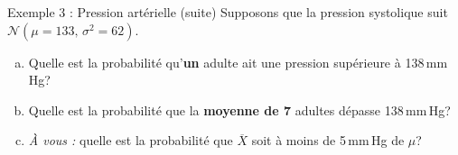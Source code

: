 \documentclass{BeamerTemplate}
\begin{document}
\begin{frame}[t]{Exemple 3 : Pression artérielle (suite)}
  Supposons que la pression systolique suit $\mathcal{N}(\mu = 133,\, \sigma^2 = 62)$.

  \medskip
  \begin{enumerate}[(a)]\itemsep 3mm
    \item Quelle est la probabilité qu'\textbf{un} adulte ait une pression supérieure à 138\,mm\,Hg?\\
    \item Quelle est la probabilité que la \textbf{moyenne de 7} adultes dépasse 138\,mm\,Hg?\\
    \item \emph{À vous :} quelle est la probabilité que $\overline{X}$ soit à moins de 5\,mm\,Hg de $\mu$?
  \end{enumerate}

  \medskip
\end{frame}
\end{document}
